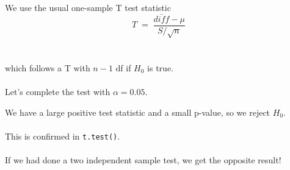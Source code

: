 \documentclass[xcolor={dvipsnames,svgnames},14pt]{beamer}
\begin{document}
\begin{frame}
We use the usual one-sample T test statistic
$$T \;=\; \frac{\bar{diff} - \mu}{S/\sqrt{n}}$$ \\~\\
which follows a T with $n - 1$ df if $H_0$ is true. \\~\\

Let's complete the test with $\alpha = 0.05$.
\end{frame}

\begin{frame}
We have a large positive test statistic and a small p-value, so we reject $H_0$. \\~\\

This is confirmed in \texttt{t.test()}. \\~\\

If we had done a two independent sample test, we get the opposite result!
\end{frame}
\end{document}
